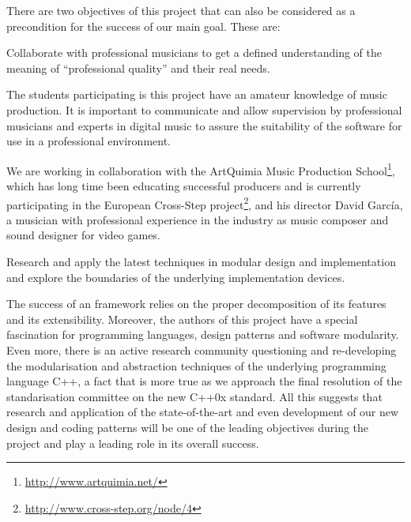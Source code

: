 There are two objectives of this project that can also be considered
as a precondition for the success of our main goal. These are:

\begin{objective} \label{obj:artquimia}
Collaborate with professional musicians to get a
defined understanding of the meaning of ``professional quality'' and
their real needs.
\end{objective}

The students participating is this project have an amateur knowledge of
music production. It is important to communicate and allow supervision
by professional musicians and experts in digital music to assure the
suitability of the software for use in a professional environment.

We are working in collaboration with the ArtQuimia Music Production
School\footnote{\url{http://www.artquimia.net/}}, which has long time
been educating successful producers and is currently participating in
the European Cross-Step
project\footnote{\url{http://www.cross-step.org/node/4}}, and his
director David García, a musician with professional experience in the
industry as music composer and sound designer for video games.


\begin{objective}
  Research and apply the latest techniques in modular design and
  implementation and explore the boundaries of the underlying
  implementation devices.
\end{objective}

The success of an framework relies on the proper decomposition of its
features and its extensibility. Moreover, the authors of this project
have a special fascination for programming languages, design patterns
and software modularity. Even more, there is an active research
community questioning and re-developing the modularisation and
abstraction techniques of the underlying programming language C++,
a fact that is more true as we approach the final resolution of the
standarisation committee on the new C++0x standard. All this suggests
that research and application of the state-of-the-art and even
development of our new design and coding patterns will be one of the
leading objectives during the project and play a leading role in
its overall success.

